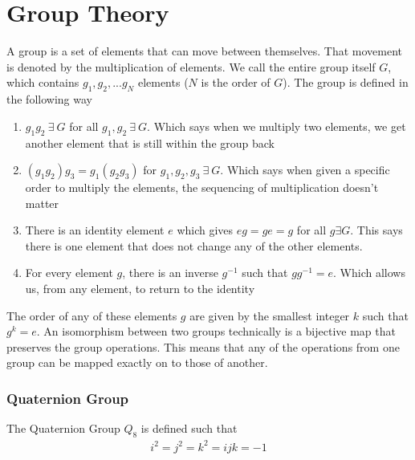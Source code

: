\chapter{Group Theory}

A group is a set of elements that can move between themselves. That movement is denoted by the multiplication of elements. We call the entire group itself $G$, which contains $g_1, g_2, ... g_N$ elements ($N$ is the order of $G$). The group is defined in the following way
\begin{enumerate}
	\item $g_1g_2~\exists ~G$ for all $g_1, g_2~\exists~ G$. Which says when we multiply two elements, we get another element that is still within the group back
	\item $(g_1g_2)g_3 = g_1(g_2g_3)$ for $g_1, g_2, g_3~\exists~ G$. Which says when given a specific order to multiply the elements, the sequencing of multiplication doesn't matter
	\item There is an identity element $e$ which gives $eg = ge = g$ for all $g\exists G$. This says there is one element that does not change any of the other elements.
	\item For every element $g$, there is an inverse $g^{-1}$ such that $gg^{-1} = e$. Which allows us, from any element, to return to the identity
\end{enumerate}
The order of any of these elements $g$ are given by the smallest integer $k$ such that $g^k = e$.
An isomorphism between two groups technically is a bijective map that preserves the group operations. This means that any of the operations from one group can be mapped exactly on to those of another.

\subsection{Quaternion Group}
The Quaternion Group $Q_8$ is defined such that
\begin{align}
	i^2 = j^2 = k^2 = ijk = -1
\end{align}

%
%
%
